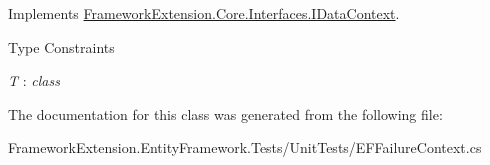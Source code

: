 Implements \hyperlink{interface_framework_extension_1_1_core_1_1_interfaces_1_1_i_data_context_a1297c0d6e59ec05855d8e25a72f49fdd}{Framework\-Extension.\-Core.\-Interfaces.\-I\-Data\-Context}.

\begin{Desc}
\item[Type Constraints]\begin{description}
\item[{\em T} : {\em class}]\end{description}
\end{Desc}


The documentation for this class was generated from the following file\-:\begin{DoxyCompactItemize}
\item 
Framework\-Extension.\-Entity\-Framework.\-Tests/\-Unit\-Tests/E\-F\-Failure\-Context.\-cs\end{DoxyCompactItemize}
